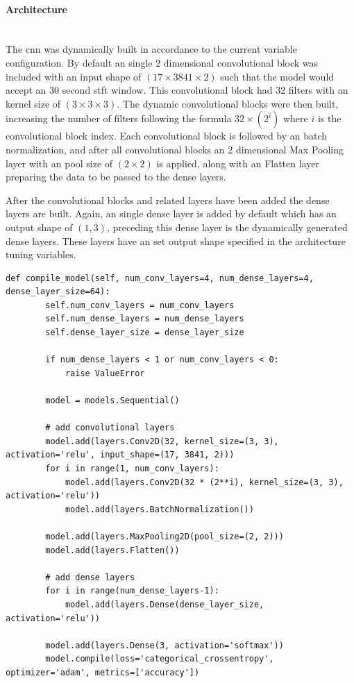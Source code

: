 \documentclass[12pt]{article}
\begin{document}
\paragraph{Architecture}\mbox{}\\

The \acrshort{cnn} was dynamically built in accordance to the current variable configuration. By default an single 2 dimensional convolutional block was included with an input shape of $(17\times3841\times2)$ such that the model would accept an 30 second \acrshort{stft} window. This convolutional block had 32 filters with an kernel size of $(3\times3\times3)$. The dynamic convolutional blocks were then built, increasing the number of filters following the formula $32 \times (2^i)$ where $i$ is the convolutional block index. Each convolutional block is followed by an batch normalization, and after all convolutional blocks an 2 dimensional Max Pooling layer with an pool size of $(2\times2)$ is applied, along with an Flatten layer preparing the data to be passed to the dense layers. 

After the convolutional blocks and related layers have been added the dense layers are built. Again, an single dense layer is added by default which has an output shape of $(1, 3)$, preceding this dense layer is the dynamically generated dense layers. These layers have an set output shape specified in the architecture tuning variables. 

\begin{lstlisting}[style=pythonstyle, caption={Function which dynamically builds an \acrshort{cnn} model from the specified parameters. Logging has been removed.}, label={lst:compile-model}]
    def compile_model(self, num_conv_layers=4, num_dense_layers=4, dense_layer_size=64):
        self.num_conv_layers = num_conv_layers
        self.num_dense_layers = num_dense_layers 
        self.dense_layer_size = dense_layer_size 

        if num_dense_layers < 1 or num_conv_layers < 0: 
            raise ValueError

        model = models.Sequential()

        # add convolutional layers
        model.add(layers.Conv2D(32, kernel_size=(3, 3), activation='relu', input_shape=(17, 3841, 2)))
        for i in range(1, num_conv_layers):
            model.add(layers.Conv2D(32 * (2**i), kernel_size=(3, 3), activation='relu'))
            model.add(layers.BatchNormalization())

        model.add(layers.MaxPooling2D(pool_size=(2, 2)))
        model.add(layers.Flatten())

        # add dense layers
        for i in range(num_dense_layers-1):
            model.add(layers.Dense(dense_layer_size, activation='relu'))

        model.add(layers.Dense(3, activation='softmax'))
        model.compile(loss='categorical_crossentropy', optimizer='adam', metrics=['accuracy'])
\end{lstlisting}
\end{document}

